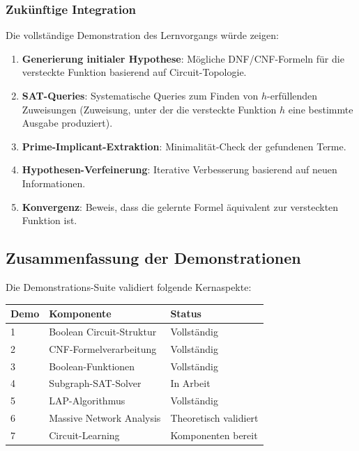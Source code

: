 ﻿\documentclass[a4paper,12pt]{article}
\theoremstyle{definition}
\begin{document}
\subsubsection{Zukünftige Integration}

Die vollständige Demonstration des Lernvorgangs würde zeigen:
\begin{enumerate}
    \item \textbf{Generierung initialer Hypothese}: Mögliche DNF/CNF-Formeln für die versteckte Funktion basierend auf Circuit-Topologie.
    
    \item \textbf{SAT-Queries}: Systematische Queries zum Finden von $h$-erfüllenden Zuweisungen (Zuweisung, unter der die versteckte Funktion $h$ eine bestimmte Ausgabe produziert).
    
    \item \textbf{Prime-Implicant-Extraktion}: Minimalität-Check der gefundenen Terme.
    
    \item \textbf{Hypothesen-Verfeinerung}: Iterative Verbesserung basierend auf neuen Informationen.
    
    \item \textbf{Konvergenz}: Beweis, dass die gelernte Formel äquivalent zur versteckten Funktion ist.
\end{enumerate}

\subsection{Zusammenfassung der Demonstrationen}

Die Demonstrations-Suite validiert folgende Kernaspekte:

\begin{center}
\begin{tabular}{lll}
\toprule
\textbf{Demo} & \textbf{Komponente} & \textbf{Status} \\
\midrule
1 & Boolean Circuit-Struktur & Vollständig \\
2 & CNF-Formelverarbeitung & Vollständig \\
3 & Boolean-Funktionen & Vollständig \\
4 & Subgraph-SAT-Solver & In Arbeit \\
5 & LAP-Algorithmus & Vollständig \\
6 & Massive Network Analysis & Theoretisch validiert \\
7 & Circuit-Learning & Komponenten bereit \\
\bottomrule
\end{tabular}
\end{center}
\end{document}
